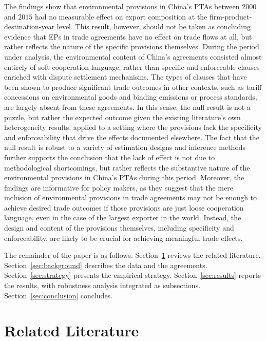 \documentclass[12pt]{article}
\begin{document}
The findings show that environmental provisions in China's PTAs between $2000$ and $2015$ had no measurable effect on export composition at the firm-product-destination-year level. This result, however, should not be taken as concluding evidence that EPs in trade agreements have no effect on trade flows at all, but rather reflects the nature of the specific provisions themselves. During the period under analysis, the environmental content of China's agreements consisted almost entirely of soft cooperation language, rather than specific and enforceable clauses enriched with dispute settlement mechanisms. The types of clauses that have been shown to produce significant trade outcomes in other contexts, such as tariff concessions on environmental goods and binding emissions or process standards, are largely absent from these agreements. In this sense, the null result is not a puzzle, but rather the expected outcome given the existing literature's own heterogeneity results, applied to a setting where the provisions lack the specificity and enforceability that drive the effects documented elsewhere. The fact that the null result is robust to a variety of estimation designs and inference methods further supports the conclusion that the lack of effect is not due to methodological shortcomings, but rather reflects the substantive nature of the environmental provisions in China's PTAs during this period. Moreover, the findings are informative for policy makers, as they suggest that the mere inclusion of environmental provisions in trade agreements may not be enough to achieve desired trade outcomes if those provisions are just loose cooperation language, even in the case of the largest exporter in the world. Instead, the design and content of the provisions themselves, including specificity and enforceability, are likely to be crucial for achieving meaningful trade effects.

The remainder of the paper is as follows. Section~\ref{sec:lit} reviews the related literature. Section~\ref{sec:background} describes the data and the agreements. Section~\ref{sec:strategy} presents the empirical strategy. Section~\ref{sec:results} reports the results, with robustness analysis integrated as subsections. Section~\ref{sec:conclusion} concludes.

\section{Related Literature}\label{sec:lit}
\end{document}
